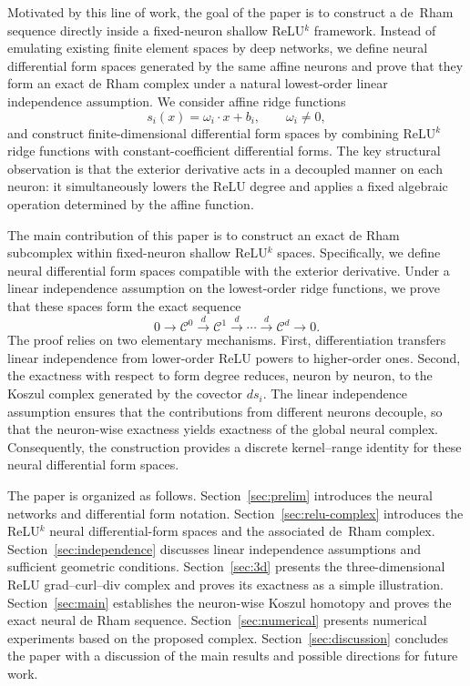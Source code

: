 \documentclass[pdflatex,sn-mathphys-num]{sn-jnl}
\numberwithin{equation}{section}
\numberwithin{theorem}{section}
\numberwithin{table}{section}
\numberwithin{figure}{section}
\begin{document}
Motivated by this line of work, the goal of the paper is to construct a  de~Rham sequence directly inside a fixed-neuron shallow ReLU$^k$ framework.  Instead of emulating existing finite element spaces by deep networks, we define neural differential form spaces generated by the same affine neurons and prove that they form an exact de Rham complex under a natural lowest-order linear independence assumption. We consider affine ridge functions
\begin{equation}
s_i(x)=\omega_i\cdot x + b_i,
\qquad \omega_i \neq 0,
\end{equation}
and construct finite-dimensional differential form spaces by combining ReLU$^k$ ridge functions with constant-coefficient differential forms.  The key structural observation is that the exterior derivative acts in a decoupled manner on each neuron:
it simultaneously lowers the ReLU degree and applies a fixed algebraic operation determined by the affine function.

The main contribution of this paper is to construct an exact de Rham subcomplex within fixed-neuron shallow ReLU$^k$ spaces. Specifically, we define neural differential form spaces compatible with the exterior derivative. Under a linear independence assumption on the lowest-order ridge functions, we prove that these spaces form the exact sequence
$$
0
\longrightarrow \mathcal{C}^0
\xrightarrow{d}
\mathcal{C}^1
\xrightarrow{d}
\cdots
\xrightarrow{d}
\mathcal{C}^d
\longrightarrow 0.
$$
The proof relies on two elementary mechanisms. First, differentiation transfers linear independence from lower-order ReLU powers to higher-order ones. Second, the exactness with respect to form degree reduces, neuron by neuron, to the Koszul complex generated by the covector $ d s_i$. The linear independence assumption ensures that the contributions from different neurons decouple, so that the neuron-wise exactness yields exactness of the global neural complex. Consequently, the construction provides a discrete kernel–range identity for these neural differential form spaces.

The paper is organized as follows. Section~\ref{sec:prelim} introduces the
neural networks and differential form notation.
Section~\ref{sec:relu-complex} introduces the ReLU$^k$ neural differential-form spaces and the associated de~Rham complex.
Section~\ref{sec:independence} discusses linear independence assumptions and sufficient geometric conditions. Section~\ref{sec:3d} presents the three-dimensional ReLU grad–curl–div complex and proves its exactness as a simple illustration. Section~\ref{sec:main} establishes the neuron-wise Koszul homotopy and proves the exact neural de Rham sequence. Section~\ref{sec:numerical} presents numerical experiments based on the proposed complex. Section~\ref{sec:discussion} concludes the paper with a discussion of the main results and possible directions for future work.
    
\end{document}
